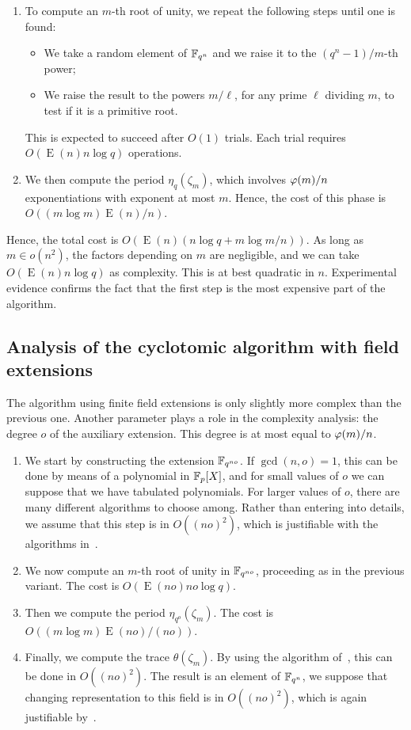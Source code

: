 \documentclass{article}
\DeclareMathOperator{\Ext}{E}
\begin{document}
\begin{enumerate}
\item To compute an $m$-th root of unity, we repeat the following
  steps until one is found:
  \begin{itemize}
  \item We take a random element of $\mathbb{F}_{q^n}$ and we raise it to the
    $(q^n-1)/m$-th power;
  \item We raise the result to the powers $m/\ell$, for any prime
    $\ell$ dividing $m$, to test if it is a primitive root.
  \end{itemize}
  This is expected to succeed after $O(1)$ trials. Each trial requires
  $O(\Ext(n)n\log q)$ operations.
\item We then compute the period $\eta_q(\zeta_m)$, which involves
  $\varphi(m)/n$ exponentiations with exponent at most $m$. Hence, the
  cost of this phase is $O((m\log m)\Ext(n)/n)$.
\end{enumerate}

Hence, the total cost is $O(\Ext(n)(n\log q + m\log m/n))$. As long as
$m\in o(n^2)$, the factors depending on $m$ are negligible, and we can
take $O(\Ext(n)n\log q)$ as complexity. This is at best quadratic in
$n$. Experimental evidence confirms the fact that the first step is
the most expensive part of the algorithm.


\subsection{Analysis of the cyclotomic algorithm with field
  extensions}

The algorithm using finite field extensions is only slightly more
complex than the previous one. Another parameter plays a role in the
complexity analysis: the degree $o$ of the auxiliary extension. This
degree is at most equal to $\varphi(m)/n$.

\begin{enumerate}
\item We start by constructing the extension $\mathbb{F}_{q^{no}}$. If
  $\gcd(n,o)=1$, this can be done by means of a polynomial in
  $\mathbb{F}_p[X]$, and for small values of $o$ we can suppose that we have
  tabulated polynomials. For larger values of $o$, there are many
  different algorithms to choose among. Rather than entering into
  details, we assume that this step is in $O\left((no)^2\right)$,
  which is justifiable with the algorithms in~\cite{}.
\item We now compute an $m$-th root of unity in $\mathbb{F}_{q^{no}}$,
  proceeding as in the previous variant. The cost is $O(\Ext(no)no\log
  q)$.
\item Then we compute the period $\eta_{q^o}(\zeta_m)$. The cost is
  $O((m\log m)\Ext(no)/(no))$. 
\item Finally, we compute the trace $\theta(\zeta_m)$. By using the
  algorithm of~\cite{}, this can be done in
  $O\left((no)^2\right)$. The result is an element of $\mathbb{F}_{q^n}$, we
  suppose that changing representation to this field is in
  $O\left((no)^2\right)$, which is again justifiable by~\cite{}.
\end{enumerate}
\end{document}
